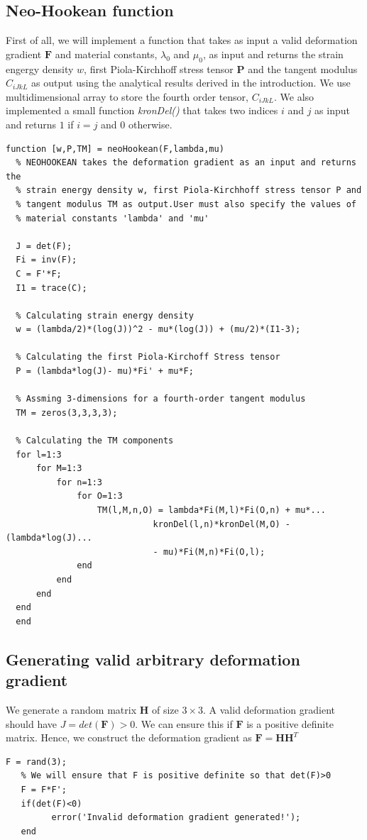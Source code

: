 \documentclass[../main.tex]{subfiles}
\begin{document}
\subsection{Neo-Hookean function}
First of all, we will implement a function that takes as input a valid
deformation gradient $\mathbf{F}$ and material constants, $\lambda_0$
and $\mu_0$, as input and returns the strain engergy density $w$,
first Piola-Kirchhoff stress tensor $\mathbf{P}$ and the tangent
modulus $C_{iJkL}$ as output using the analytical results derived in
the introduction. We use multidimensional array to store the fourth
order tensor, $C_{iJkL}$. We also implemented a small function
\textit{kronDel()} that takes two indices $i$ and $j$ as input and
returns $1$ if $i=j$ and $0$ otherwise.
\begin{lstlisting}[style=Matlab-editor]
  function [w,P,TM] = neoHookean(F,lambda,mu)
  % NEOHOOKEAN takes the deformation gradient as an input and returns the
  % strain energy density w, first Piola-Kirchhoff stress tensor P and
  % tangent modulus TM as output.User must also specify the values of
  % material constants 'lambda' and 'mu'
  
  J = det(F);
  Fi = inv(F);
  C = F'*F;
  I1 = trace(C);
  
  % Calculating strain energy density
  w = (lambda/2)*(log(J))^2 - mu*(log(J)) + (mu/2)*(I1-3);
  
  % Calculating the first Piola-Kirchoff Stress tensor
  P = (lambda*log(J)- mu)*Fi' + mu*F;
  
  % Assming 3-dimensions for a fourth-order tangent modulus
  TM = zeros(3,3,3,3);
  
  % Calculating the TM components
  for l=1:3
      for M=1:3
          for n=1:3
              for O=1:3
                  TM(l,M,n,O) = lambda*Fi(M,l)*Fi(O,n) + mu*...
                             kronDel(l,n)*kronDel(M,O) - (lambda*log(J)...
                             - mu)*Fi(M,n)*Fi(O,l);
              end
          end
      end
  end
  end
\end{lstlisting}

\subsection{Generating valid arbitrary deformation gradient}
We generate a random matrix $\mathbf{H}$ of size $3\times 3$. A valid
deformation gradient should have $J = det(\mathbf{F}) > 0$. We can
ensure this if $\mathbf{F}$ is a positive definite matrix. Hence, we
construct the deformation gradient as $\mathbf{F} = \mathbf{HH}^T$
 \begin{lstlisting}[style=Matlab-editor]
   F = rand(3);
   % We will ensure that F is positive definite so that det(F)>0
   F = F*F';
   if(det(F)<0)
         error('Invalid deformation gradient generated!');
   end
 \end{lstlisting}
\end{document}
